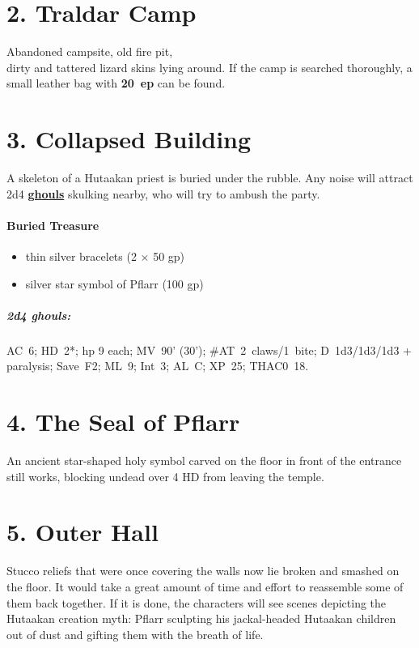\documentclass[english,11pt,openany,letterpaper,twocolumn]{book}
\begin{document}
\hypertarget{room2}{}
\section{2. Traldar Camp}

Abandoned campsite, old fire pit,\\dirty and tattered lizard skins lying around.
If the camp is searched thoroughly, a small leather bag with \textbf{20~ep} can be found.


\hypertarget{room3}{}
\section{3. Collapsed Building}

A skeleton of a Hutaakan priest is buried under the rubble. Any noise will attract 2d4 \hyperlink{ghoul}{\textbf{ghouls}} skulking nearby, who will try to ambush the party.

\skipline
\paragraph{Buried Treasure}
\begin{itemize}[leftmargin=*]
	\item thin silver bracelets (2 × 50 gp)
	\item silver star symbol of Pflarr (100 gp)
\end{itemize}

\begin{textbox}
	\subparagraph{2d4 ghouls:} AC~6; HD~2*; hp 9 each; MV~90' (30'); \#AT~2~claws/1~bite; D~1d3/1d3/1d3 + paralysis; Save~F2; ML~9; Int~3; AL~C; XP~25; THAC0~18.
\end{textbox}


\hypertarget{room4}{}
\section{4. The Seal of Pflarr}

An ancient star-shaped holy symbol carved on the floor in front of the entrance still works, blocking undead over 4 HD from leaving the temple.


\hypertarget{room5}{}
\section{5. Outer Hall}

Stucco reliefs that were once covering the walls now lie broken and smashed on the floor. It would take a great amount of time and effort to reassemble some of them back together. If it is done, the characters will see scenes depicting the Hutaakan creation myth: Pflarr sculpting his jackal-headed Hutaakan children out of dust and gifting them with the breath of life.
\end{document}
